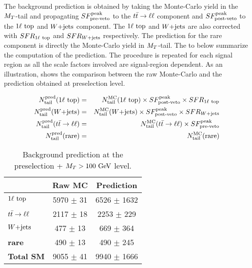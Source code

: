         The background prediction is obtained by taking the Monte-Carlo yield in the
        $M_T$-tail and propagating $SF_{\text{pre-veto}}^{\text{peak}}$ to the $t\bar{t} \rightarrow \ell \ell$ component and $SF_{\text{post-veto}}^{\text{peak}}$
        to the $1\ell~\text{top}$ and $\text{$W$+jets}$ component. The $1\ell~\text{top}$ and $\text{$W$+jets}$
        are also corrected with $SFR_{1\ell~\text{top}}$ and $SFR_{\text{$W$+jets}}$ respectively. The
        prediction for the rare component is directly the Monte-Carlo yield in $M_T$-tail.
        The  to  below summarize
        the computation of the prediction. The procedure is repeated for each signal
        region as all the scale factors involved are signal-region dependent. As an
        illustration,  shows the comparison between
        the raw Monte-Carlo and the prediction obtained at preselection level.

        \begin{eqnarray}
            N^\text{pred}_\text{tail}(1\ell~\text{top}) & = & N^\text{MC}_\text{tail}(1\ell~\text{top})  \times SF_{\text{post-veto}}^{\text{peak}} \times SFR_{1\ell~\text{top}} \label{eq:prediction1ltop}  \\
            N^\text{pred}_\text{tail}(\text{$W$+jets})        & = & N^\text{MC}_\text{tail}(\text{$W$+jets})         \times SF_{\text{post-veto}}^{\text{peak}}  \times SFR_{\text{$W$+jets}}                             \\
            N^\text{pred}_\text{tail}(t\bar{t} \rightarrow \ell \ell)  & = & N^\text{MC}_\text{tail}(t\bar{t} \rightarrow \ell \ell)   \times SF_{\text{pre-veto}}^{\text{peak}}                                                \\
            N^\text{pred}_\text{tail}(\text{rare})   & = & N^\text{MC}_\text{tail}(\text{rare})                                           \label{eq:predictionrare}
        \end{eqnarray}

        \begin{table}[!h]
            \begin{center}
                \begin{tabular}{|l|c|c|}
                    \hline
                                             &  \textbf{Raw MC}    & \textbf{Prediction}       \\
                    \hline
                    \textbf{$1\ell~\text{top}$} &  5970 $\pm$ 31      & 6526 $\pm$ 1632     \\
                    \textbf{$t\bar{t} \rightarrow \ell \ell$}  &  2117 $\pm$ 18      & 2253 $\pm$  229     \\
                    \textbf{$\text{$W$+jets}$}        &   477 $\pm$ 13      &  669 $\pm$  364     \\
                    \textbf{rare}            &   490 $\pm$ 13      &  490 $\pm$  245     \\
                    \hline
                    \textbf{Total SM}        &  9055 $\pm$ 41      & 9940 $\pm$ 1666     \\
                    \hline
                \end{tabular}
                \caption{ Background prediction at the preselection + $M_T > 100~\text{GeV}$ level.}
                \label{tab:predictionPreselection}
            \end{center}
        \end{table}

